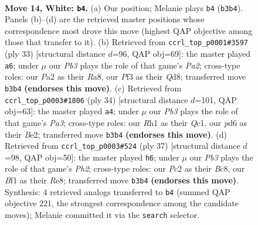 \documentclass[11pt]{article}
\begin{document}
\clearpage

\begin{figure}[p]\centering
\begin{subfigure}{0.46\textwidth}\centering
\resizebox{\linewidth}{!}{%
\newchessgame
\chessboard[
  setfen={2kr3r/B1p1bppp/1pbpqn2/8/4P1P1/1PNQ1P2/P1P4P/2KR1B1R w - - 0 14},
  showmover=false,
  pgfstyle=straightmove, color=movearrow, markmove={b3-b4}
]}
\caption{}
\end{subfigure}\hfill
\begin{subfigure}{0.46\textwidth}\centering
\resizebox{\linewidth}{!}{%
\newchessgame
\chessboard[
  setfen={r2qrbk1/p4pp1/2pp1n1p/1p6/P2BPP2/2NQ3P/1PP3P1/3RR1K1 b - - 0 17},
  showmover=false,
  pgfstyle=straightmove, color=movearrow, markmove={a7-a6}
]}
\caption{}
\end{subfigure}
\\[4pt]
\begin{subfigure}{0.46\textwidth}\centering
\resizebox{\linewidth}{!}{%
\newchessgame
\chessboard[
  setfen={2r1rbk1/ppp2pp1/2n4p/3q1b2/3P1B2/P1P2N1P/4BPP1/R1Q1R1K1 w - - 2 18},
  showmover=false,
  pgfstyle=straightmove, color=movearrow, markmove={a3-a4}
]}
\caption{}
\end{subfigure}\hfill
\begin{subfigure}{0.46\textwidth}\centering
\resizebox{\linewidth}{!}{%
\newchessgame
\chessboard[
  setfen={r1b1r1k1/1p2qpbp/2p2np1/p7/P2N1B2/4PB1P/1PQR1PP1/2R3K1 b - - 4 19},
  showmover=false,
  pgfstyle=straightmove, color=movearrow, markmove={h7-h6}
]}
\caption{}
\end{subfigure}
\caption{\textbf{Move 14, White: \texttt{b4}.} (a) Our position; Melanie plays \texttt{b4} (\texttt{b3b4}). Panels (b)--(d) are the retrieved master positions whose correspondence most drove this move (highest QAP objective among those that transfer to it). (b) Retrieved from \texttt{ccrl\_top\_p0001\#3597} (ply 33) [structural distance $d$=96, QAP obj=69]: the master played \texttt{a6}; under $\mu$ our \emph{Pb3} plays the role of that game's \emph{Pa2}; cross-type roles: our \emph{P}a2 as their \emph{R}a8, our \emph{P}f3 as their \emph{Q}d8; transferred move \texttt{b3b4} \textbf{(endorses this move)}. (c) Retrieved from \texttt{ccrl\_top\_p0003\#1806} (ply 34) [structural distance $d$=101, QAP obj=63]: the master played \texttt{a4}; under $\mu$ our \emph{Pb3} plays the role of that game's \emph{Pa3}; cross-type roles: our \emph{R}h1 as their \emph{Q}c1, our \emph{p}d6 as their \emph{B}e2; transferred move \texttt{b3b4} \textbf{(endorses this move)}. (d) Retrieved from \texttt{ccrl\_top\_p0003\#524} (ply 37) [structural distance $d$=98, QAP obj=50]: the master played \texttt{h6}; under $\mu$ our \emph{Pb3} plays the role of that game's \emph{Ph2}; cross-type roles: our \emph{P}c2 as their \emph{B}c8, our \emph{B}f1 as their \emph{R}e8; transferred move \texttt{b3b4} \textbf{(endorses this move)}. Synthesis: 4 retrieved analogs transferred to \texttt{b4} (summed QAP objective 221, the strongest correspondence among the candidate moves); Melanie committed it via the \texttt{search} selector.}
\label{fig:thought-m26}
\end{figure}
\end{document}
